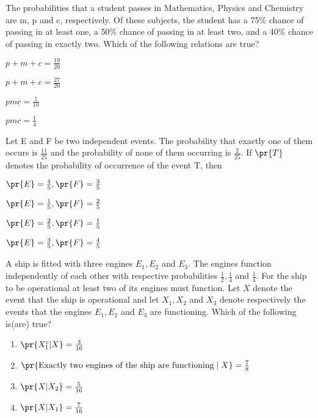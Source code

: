 \item The probabilities that a student passes in Mathematics, Physics and Chemistry are m, p and c, respectively. Of these subjects, the student has a 75\% chance of passing in at least one, a 50\% chance of passing in at least two, and a 40\% chance of passing in exactly two. Which of the following relations are true?
\hfill{}
\begin{enumerate}
\begin{multicols}{2}
\item $p+m+c=\frac{19}{20}$
\columnbreak
\item $p+m+c=\frac{27}{20}$
\end{multicols}
\begin{multicols}{2}
\item $pmc=\frac{1}{10}$
\columnbreak
\item $pmc=\frac{1}{4}$
\end{multicols}
\end{enumerate}
\item Let E and F be two independent events. The probability that exactly one of them occurs is $\frac{11}{25}$ and the probability of none of them occurring is $\frac{2}{25}$. If $\pr{T}$ denotes the probability of occurrence of the event T, then
\hfill{}
\begin{enumerate}
\begin{multicols}{2}
\item $\pr{E}=\frac{4}{5},\pr{F}=\frac{3}{5}$
\columnbreak
\item $\pr{E}=\frac{1}{5},\pr{F}=\frac{2}{5}$
\end{multicols}
\begin{multicols}{2}
\item $\pr{E}=\frac{2}{5},\pr{F}=\frac{1}{5}$
\columnbreak
\item $\pr{E}=\frac{3}{5},\pr{F}=\frac{4}{5}$
\end{multicols}
\end{enumerate}
\item A ship is fitted with three engines $E_1,E_2$ and $E_3$. The engines function independently of each other with respective probabilities $\frac{1}{2},\frac{1}{4}$ and $\frac{1}{4}$. For the ship to be operational at least two of its engines must function. Let $X$ denote the event that the ship is operational and let $X_1,X_2$ and $X_3$ denote respectively the events that the engines $E_1,E_2$ and $E_3$ are functioning. Which of the following is(are) true?
\hfill{}
\begin{enumerate}
\item $\pr{X_1^c|X}=\frac{3}{16}$
\item $\pr{\text{Exactly two engines of the ship are functioning}\;|\; X}=\frac{7}{8}$
\item $\pr{X|X_2}=\frac{5}{16}$
\item $\pr{X|X_1}=\frac{7}{16}$
\end{enumerate}
